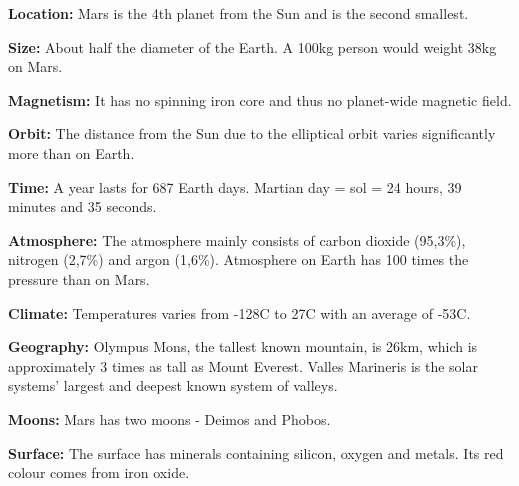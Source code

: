 \begin{tcolorbox}[colback=green!5,colframe=green!40!black,title=Mars: 10 facts about the red planet]
\textbf{Location:} Mars is the 4th planet from the Sun and is the second smallest.

\textbf{Size:} About half the diameter of the Earth. A 100kg person would weight 38kg on Mars.

\textbf{Magnetism:} It has no spinning iron core and thus no planet-wide magnetic field.

\textbf{Orbit:} The distance from the Sun due to the elliptical orbit varies significantly more than on Earth.

\textbf{Time:} A year lasts for 687 Earth days. Martian day = sol = 24 hours, 39 minutes and 35 seconds.

\textbf{Atmosphere:} The atmosphere mainly consists of carbon dioxide (95,3\%), nitrogen (2,7\%) and argon (1,6\%).
Atmosphere on Earth has 100 times the pressure than on Mars.

\textbf{Climate:} Temperatures varies from -128C to 27C with an average of -53C.

\textbf{Geography:} Olympus Mons, the tallest known mountain, is 26km, which is approximately 3 times as tall as Mount Everest.
Valles Marineris is the solar systems' largest and deepest known system of valleys.

\textbf{Moons:} Mars has two moons - Deimos and Phobos.

\textbf{Surface:} The surface has minerals containing silicon, oxygen and metals. Its red colour comes from iron oxide.
\end{tcolorbox}